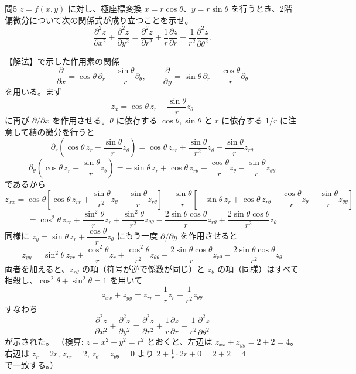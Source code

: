 \documentclass[a4paper,11pt]{article}
\begin{document}
\clearpage
\begin{mondaiboxS}{問5}
$z = f(x,y)$ に対し、極座標変換 $x = r\cos\theta$、$y = r\sin\theta$ を行うとき、2階偏微分について次の関係式が成り立つことを示せ。
\[
\frac{\partial^{2} z}{\partial x^{2}} + \frac{\partial^{2} z}{\partial y^{2}} = \frac{\partial^{2} z}{\partial r^{2}} + \frac{1}{r}\frac{\partial z}{\partial r} + \frac{1}{r^{2}}\frac{\partial^{2} z}{\partial \theta^{2}}.
\]
\end{mondaiboxS}
\kaitou
【解法】で示した作用素の関係
\[
\frac{\partial}{\partial x} = \cos\theta\,\partial_{r} - \frac{\sin\theta}{r}\partial_{\theta}, \qquad
\frac{\partial}{\partial y} = \sin\theta\,\partial_{r} + \frac{\cos\theta}{r}\partial_{\theta}
\]
を用いる。まず
\[
z_{x} = \cos\theta\, z_{r} - \frac{\sin\theta}{r} z_{\theta}
\]
に再び $\partial/\partial x$ を作用させる。$\theta$ に依存する $\cos\theta,\sin\theta$ と $r$ に依存する $1/r$ に注意して積の微分を行うと
\[
\partial_{r}\left(\cos\theta\,z_{r} - \frac{\sin\theta}{r}z_{\theta}\right)
= \cos\theta\,z_{rr} + \frac{\sin\theta}{r^{2}}z_{\theta} - \frac{\sin\theta}{r}z_{r\theta}
\]
\[
\partial_{\theta}\left(\cos\theta\,z_{r} - \frac{\sin\theta}{r}z_{\theta}\right)
= -\sin\theta\,z_{r} + \cos\theta\,z_{r\theta} - \frac{\cos\theta}{r}z_{\theta} - \frac{\sin\theta}{r}z_{\theta\theta}
\]
であるから
\[
z_{xx} = \cos\theta\left[\cos\theta\,z_{rr} + \frac{\sin\theta}{r^{2}}z_{\theta} - \frac{\sin\theta}{r}z_{r\theta}\right]
- \frac{\sin\theta}{r}\left[-\sin\theta\,z_{r} + \cos\theta\,z_{r\theta} - \frac{\cos\theta}{r}z_{\theta} - \frac{\sin\theta}{r}z_{\theta\theta}\right]
\]
\[
= \cos^{2}\theta\, z_{rr} + \frac{\sin^{2}\theta}{r}z_{r} + \frac{\sin^{2}\theta}{r^{2}}z_{\theta\theta} - \frac{2\sin\theta\cos\theta}{r}z_{r\theta} + \frac{2\sin\theta\cos\theta}{r^{2}}z_{\theta}
\]
同様に $z_{y} = \sin\theta\,z_{r} + \dfrac{\cos\theta}{r}z_{\theta}$ にもう一度 $\partial/\partial y$ を作用させると
\[
z_{yy} = \sin^{2}\theta\, z_{rr} + \frac{\cos^{2}\theta}{r}z_{r} + \frac{\cos^{2}\theta}{r^{2}}z_{\theta\theta} + \frac{2\sin\theta\cos\theta}{r}z_{r\theta} - \frac{2\sin\theta\cos\theta}{r^{2}}z_{\theta}
\]
両者を加えると、$z_{r\theta}$ の項（符号が逆で係数が同じ）と $z_{\theta}$ の項（同様）はすべて相殺し、$\cos^{2}\theta+\sin^{2}\theta=1$ を用いて
\[
z_{xx}+z_{yy} = z_{rr} + \frac{1}{r}z_{r} + \frac{1}{r^{2}}z_{\theta\theta}
\]
すなわち
\[
\boxed{\; \frac{\partial^{2} z}{\partial x^{2}} + \frac{\partial^{2} z}{\partial y^{2}} = \frac{\partial^{2} z}{\partial r^{2}} + \frac{1}{r}\frac{\partial z}{\partial r} + \frac{1}{r^{2}}\frac{\partial^{2} z}{\partial \theta^{2}} \;}
\]
が示された。
（検算: $z=x^{2}+y^{2}=r^{2}$ とおくと、左辺は $z_{xx}+z_{yy}=2+2=4$。右辺は $z_r=2r,\,z_{rr}=2,\,z_\theta=z_{\theta\theta}=0$ より $2+\tfrac{1}{r}\cdot2r+0=2+2=4$ で一致する。）
\end{document}
